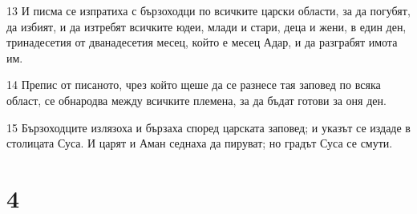 \par 13 И писма се изпратиха с бързоходци по всичките царски области, за да погубят, да избият, и да изтребят всичките юдеи, млади и стари, деца и жени, в един ден, тринадесетия от дванадесетия месец, който е месец Адар, и да разграбят имота им.
\par 14 Препис от писаното, чрез който щеше да се разнесе тая заповед по всяка област, се обнародва между всичките племена, за да бъдат готови за оня ден.
\par 15 Бързоходците излязоха и бързаха според царската заповед; и указът се издаде в столицата Суса. И царят и Аман седнаха да пируват; но градът Суса се смути.

\chapter{4}

